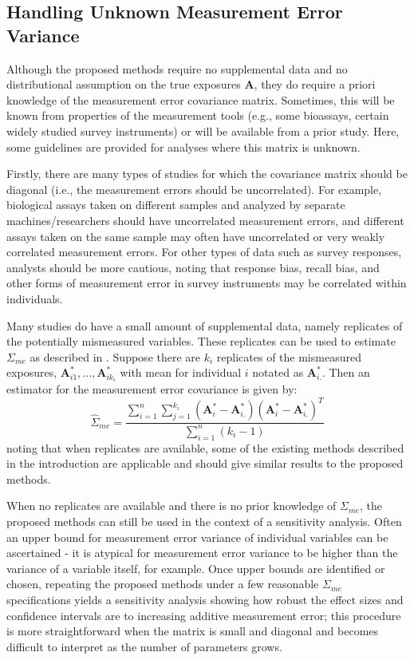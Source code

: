 \documentclass[useAMS,usenatbib,referee]{biom}
\begin{document}
\subsection{Handling Unknown Measurement Error Variance}

Although the proposed methods require no supplemental data and no distributional assumption on the true exposures $\bm{A}$, they do require a priori knowledge of the measurement error covariance matrix. Sometimes, this will be known from properties of the measurement tools (e.g., some bioassays, certain widely studied survey instruments) or will be available from a prior study. Here, some guidelines are provided for analyses where this matrix is unknown.

Firstly, there are many types of studies for which the covariance matrix should be diagonal (i.e., the measurement errors should be uncorrelated). For example, biological assays taken on different samples and analyzed by separate machines/researchers should have uncorrelated measurement errors, and different assays taken on the same sample may often have uncorrelated or very weakly correlated measurement errors. For other types of data such as survey responses, analysts should be more cautious, noting that response bias, recall bias, and other forms of measurement error in survey instruments may be correlated within individuals.

Many studies do have a small amount of supplemental data, namely replicates of the potentially mismeasured variables. These replicates can be used to estimate $\Sigma_{me}$ as described in \citet{carroll2006}. Suppose there are $k_{i}$ replicates of the mismeasured exposures, $\bm{A}^{*}_{i1}, ..., \bm{A}^{*}_{ik_{i}}$ with mean for individual $i$ notated as $\bm{A}^{*}_{i.}$. Then an estimator for the measurement error covariance is given by:
\begin{equation*}
    \hat{\Sigma}_{me} = \frac{\sum_{i=1}^{n} \sum_{j=1}^{k_{i}} (\bm{A}^{*}_{i} - \bm{A}^{*}_{i.})(\bm{A}^{*}_{i} - \bm{A}^{*}_{i.})^{T}}{\sum_{i=1}^{n}(k_{i} - 1)}
\end{equation*}
noting that when replicates are available, some of the existing methods described in the introduction are applicable and should give similar results to the proposed methods.

When no replicates are available and there is no prior knowledge of $\Sigma_{me}$, the proposed methods can still be used in the context of a sensitivity analysis. Often an upper bound for measurement error variance of individual variables can be ascertained - it is atypical for measurement error variance to be higher than the variance of a variable itself, for example. Once upper bounds are identified or chosen, repeating the proposed methods under a few reasonable $\Sigma_{me}$ specifications yields a sensitivity analysis showing how robust the effect sizes and confidence intervals are to increasing additive measurement error; this procedure is more straightforward when the matrix is small and diagonal and becomes difficult to interpret as the number of parameters grows.
\end{document}

